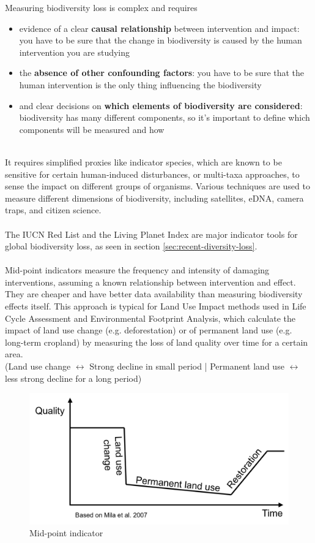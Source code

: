 \documentclass[../summary.tex]{subfiles}
\begin{document}
Measuring biodiversity loss is complex and requires

\begin{itemize}
	\item evidence of a clear \textbf{causal relationship }between intervention and impact: you have to be sure that the change in biodiversity is caused by the human intervention you are studying
	\item the \textbf{absence of other confounding factors}: you have to be sure that the human intervention is the only thing influencing the biodiversity
	\item and clear decisions on \textbf{which elements of biodiversity are considered}: biodiversity has many different components, so it’s important to define which components will be measured and how
\end{itemize}
 \ \\
 It requires simplified proxies like indicator species, which are known to be sensitive for certain human-induced disturbances,  or multi-taxa approaches, to sense the impact on different groups of organisms. Various techniques are used to measure different dimensions of biodiversity, including satellites, eDNA, camera traps, and citizen science.\\
 \\
 The IUCN Red List and the Living Planet Index are major indicator tools for global biodiversity loss, as seen in section \ref{sec:recent-diversity-loss}.
\\
\\
Mid-point indicators measure the frequency and intensity of damaging interventions, assuming a known relationship between intervention and effect. They are cheaper and have better data availability than measuring biodiversity effects itself. This approach is typical for Land Use Impact methods used in Life Cycle Assessment and Environmental Footprint Analysis, which calculate the impact of land use change (e.g. deforestation) or of permanent land use (e.g. long-term cropland) by measuring the loss of land quality over time for a certain area.  \\
(Land use change $\leftrightarrow$ Strong decline in small period | Permanent land use $\leftrightarrow$ less strong decline for a long period)

\begin{figure}[H]
	\centering
	\includegraphics[width=0.5\linewidth]{../images/mid_point_indicator}
	\caption{Mid-point indicator}
	\label{fig:midpointindicator}
\end{figure}
\newpage
\end{document}
